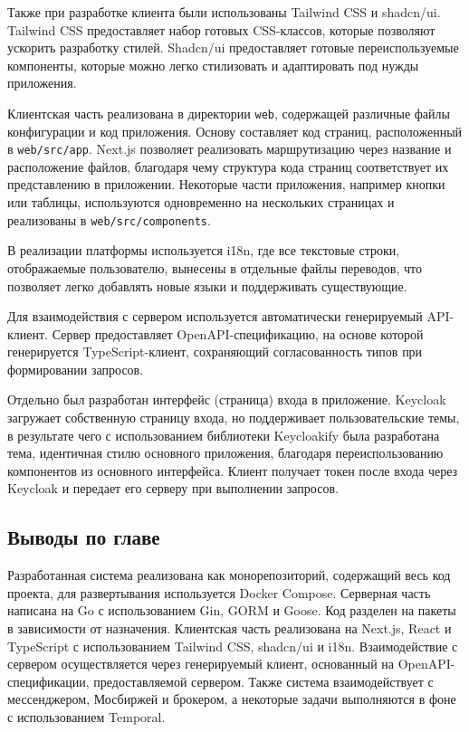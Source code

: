\documentclass[14pt]{gost-7-32}
\begin{document}
Также при разработке клиента были использованы Tailwind CSS и shadcn/ui. Tailwind CSS предоставляет набор готовых CSS-классов, которые позволяют ускорить разработку стилей. Shadcn/ui предоставляет готовые переиспользуемые компоненты, которые можно легко стилизовать и адаптировать под нужды приложения.

Клиентская часть реализована в директории \texttt{web}, содержащей различные файлы конфигурации и код приложения. Основу составляет код страниц, расположенный в \texttt{web/src/app}. Next.js позволяет реализовать маршрутизацию через название и расположение файлов, благодаря чему структура кода страниц соответствует их представлению в приложении. Некоторые части приложения, например кнопки или таблицы, используются одновременно на нескольких страницах и реализованы в \texttt{web/src/components}.

В реализации платформы используется i18n, где все текстовые строки, отображаемые пользователю, вынесены в отдельные файлы переводов, что позволяет легко добавлять новые языки и поддерживать существующие.

Для взаимодействия с сервером используется автоматически генерируемый API-клиент. Сервер предоставляет OpenAPI-спецификацию, на основе которой генерируется TypeScript-клиент, сохраняющий согласованность типов при формировании запросов.

Отдельно был разработан интерфейс (страница) входа в приложение. Keycloak загружает собственную страницу входа, но поддерживает пользовательские темы, в результате чего с использованием библиотеки Keycloakify была разработана тема, идентичная стилю основного приложения, благодаря переиспользованию компонентов из основного интерфейса. Клиент получает токен после входа через Keycloak и передает его серверу при выполнении запросов.

\subsection{Выводы по главе}

Разработанная система реализована как монорепозиторий, содержащий весь код проекта, для развертывания используется Docker Compose. Серверная часть написана на Go с использованием Gin, GORM и Goose. Код разделен на пакеты в зависимости от назначения. Клиентская часть реализована на Next.js, React и TypeScript с использованием Tailwind CSS, shadcn/ui и i18n. Взаимодействие с сервером осуществляется через генерируемый клиент, основанный на OpenAPI-спецификации, предоставляемой сервером. Также система взаимодействует с мессенджером, Мосбиржей и брокером, а некоторые задачи выполняются в фоне с использованием Temporal.
\end{document}
